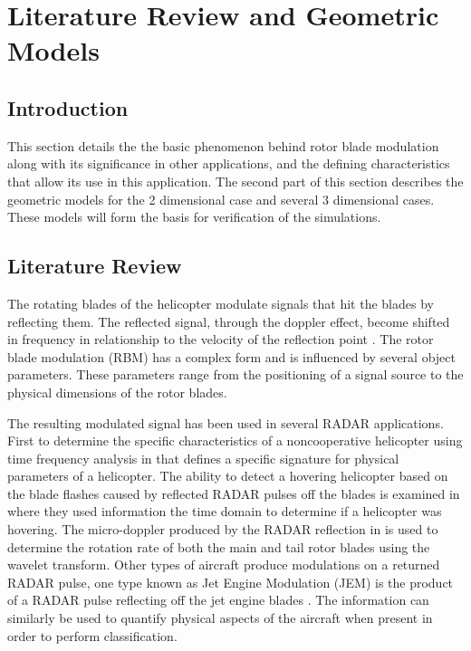 \chapter{Literature Review and Geometric Models} \label{ch:background}

\section{Introduction}
This section details the the basic phenomenon behind rotor blade modulation along with its significance in other applications, and the defining characteristics that allow its use in this application. The second part of this section describes the geometric models for the 2 dimensional case and several 3 dimensional cases. These models will form the basis for verification of the simulations.

\section{Literature Review}
The rotating blades of the helicopter modulate signals that hit the blades by reflecting them. The reflected signal, through the doppler effect, become shifted in frequency in relationship to the velocity of the reflection point \cite{YiminZhang2000}. The rotor blade modulation (RBM) has a complex form and is influenced by several object parameters. These parameters range from the positioning of a signal source to the physical dimensions of the rotor blades. 

The resulting modulated signal has been used in several RADAR applications. First to determine the specific characteristics of a noncooperative helicopter using time frequency analysis in \cite{Bullard1991} that defines a specific signature for physical parameters of a helicopter. The ability to detect a hovering helicopter based on the blade flashes caused by reflected RADAR pulses off the blades is examined in \cite{Misiurewicz1997} where they used information the time domain to determine if a helicopter was hovering. The micro-doppler produced by the RADAR reflection in \cite{Thayaparan2007} is used to determine the rotation rate of both the main and tail rotor blades using the wavelet transform. Other types of aircraft produce modulations on a returned RADAR pulse, one type known as Jet Engine Modulation (JEM) is the product of a RADAR pulse reflecting off the jet engine blades \cite{NavalAirSystemsCommand1999}. The information can similarly be used to quantify physical aspects of the aircraft when present in order to perform classification.

